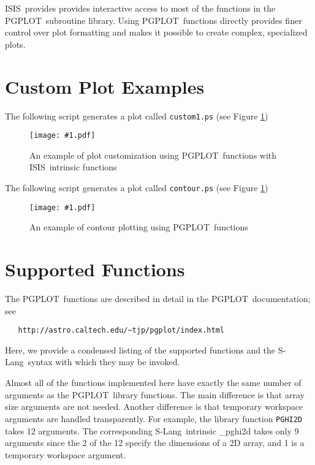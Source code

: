 \documentclass{book}
\newcommand{\putfig}[1]{\texttt{[image: \#1.pdf]}}
\newcommand{\putfig}[1]{\psfig{file=#1.ps}}
\newcommand{\isisx}{{\sc ISIS~}}
\newcommand{\pgplot}{{\sc PGPLOT}}
\newcommand{\slang}{{\sc S-Lang}}
\begin{document}
{\isisx provides provides interactive access to most of the
functions in the \pgplot\ subroutine library. Using \pgplot\
functions directly provides finer control over plot formatting and
makes it possible to create complex, specialized plots.

\section{Custom Plot Examples}

The following script generates a plot called {\tt custom1.ps} (see Figure
\ref{fig:custom1})

\begin{figure}[ht]
\putfig{figures/custom1}
\caption{An example of plot customization using \pgplot\ functions with
\isisx intrinsic functions}
\label{fig:custom1}
\end{figure}



\clearpage

The following script generates a plot called {\tt contour.ps} (see Figure
\ref{fig:custom1})

\begin{figure}[ht]
\putfig{figures/contour}
\caption{An example of contour plotting using \pgplot\ functions}
\label{fig:contour}
\end{figure}



\clearpage

\section{Supported Functions}

The \pgplot\ functions are described in detail in the \pgplot\
documentation;  see
\begin{verbatim}
   http://astro.caltech.edu/~tjp/pgplot/index.html
\end{verbatim}
Here, we provide a condensed listing of the supported
functions and the \slang\ syntax with which they may be invoked.

Almost all of the functions implemented here have exactly the same
number of arguments as the \pgplot\ library functions.  The main
difference is that array size arguments are not needed.  Another
difference is that temporary workspace arguments are handled
transparently.  For example, the library function {\tt PGHI2D} takes
12 arguments.  The corresponding
\slang\  intrinsic \_pghi2d takes only 9 arguments since the 2 of the 12
specify the dimensions of a 2D array, and 1 is a temporary workspace argument.

}
\end{document}
